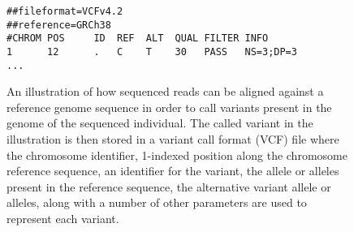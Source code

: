 \begin{figure}[H]
\begin{center}
\vspace{1em}
\begin{lstlisting}[style=vcf]
##fileformat=VCFv4.2
##reference=GRCh38
#CHROM POS     ID  REF  ALT  QUAL FILTER INFO
1      12      .   C    T    30   PASS   NS=3;DP=3
...
\end{lstlisting}
\caption{
An illustration of how sequenced reads can be aligned against a reference genome sequence in order to call variants present in the genome of the sequenced individual. The called variant in the illustration is then stored in a variant call format (VCF) file where the chromosome identifier, 1-indexed position along the chromosome reference sequence, an identifier for the variant, the allele or alleles present in the reference sequence, the alternative variant allele or alleles, along with a number of other parameters are used to represent each variant.
}
\label{background:variant_and_variant_calling:figures:variant_calling}
\end{center}
\end{figure}
